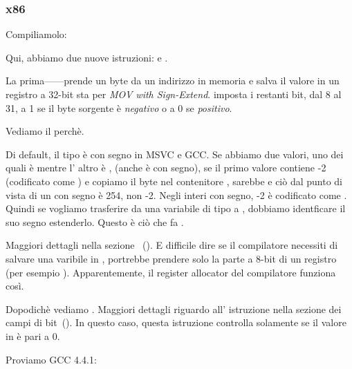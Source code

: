 \subsubsection{x86}


Compiliamolo:




Qui, abbiamo due nuove istruzioni: \MOVSX e \TEST.

\label{MOVSX}

La prima---\MOVSX---prende un byte da un indirizzo in memoria e salva il valore in un registro a 32-bit 
\MOVSX sta per \emph{MOV with Sign-Extend}. 
\MOVSX imposta i restanti bit, dal 8 al 31, 
a 1 se il byte sorgente è \emph{negativo} o a 0 se \emph{positivo}.

Vediamo il perchè.

Di default, il tipo \Tchar è con segno in MSVC e GCC. Se abbiamo due valori, uno dei quali è \Tchar 
mentre l' altro è \Tint, (anche \Tint è con segno), se il primo valore contiene -2 (codificato come ) 
e copiamo il byte nel contenitore \Tint, sarebbe  e ciò 
dal punto di vista di un \Tint con segno è 254, non -2. Negli interi con segno, -2 è codificato come . 
Quindi se vogliamo trasferire  da una variabile di tipo \Tchar a \Tint, 
dobbiamo identficare il suo segno estenderlo. Questo è ciò che fa \MOVSX.

Maggiori dettagli nella sezione \q{\emph{\SignedNumbersSectionName}} ~().
E difficile dire se il compilatore necessiti di salvare una varibile \Tchar in \EDX, portrebbe prendere solo la parte a 8-bit di un registro 
(per esempio \DL). Apparentemente, il \gls{register allocator} del compilatore funziona così.


Dopodichè vediamo . 
Maggiori dettagli riguardo all' istruzione \TEST nella sezione dei campi di bit~().
In questo caso, questa istruzione controlla solamente se il valore in \EDX è pari a 0.


Proviamo GCC 4.4.1:



